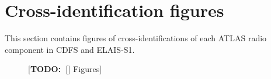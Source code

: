 \documentclass[fleqn,usenatbib,usedcolumn]{mnras}
\newcommand{\todo}[1]{ {\color{red}[{\bf TODO:~{#1}}]} }
\begin{document}
\section{Cross-identification figures}\label{app:examples}

    This section contains figures of cross-identifications of each ATLAS radio component in CDFS and ELAIS-S1.

    \begin{figure}
      \caption{\todo[Figures]}
    \end{figure}


\bsp	%
\label{lastpage}
\end{document}
